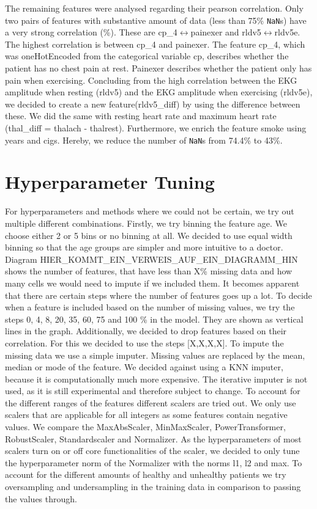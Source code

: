 The remaining features were analysed regarding their pearson correlation. Only two pairs of features with substantive amount of data (less than 75\% \texttt{NaN}s) have a very strong correlation (\%).  
These are cp\_4$\leftrightarrow$painexer and rldv5$\leftrightarrow$rldv5e. The highest correlation is between cp\_4 and painexer. The feature cp\_4, which was oneHotEncoded from the categorical variable cp, describes whether the patient has no chest pain at rest. Painexer describes whether the patient only has pain when exercising. 
Concluding from the high correlation between the EKG amplitude when resting (rldv5) and the EKG amplitude when exercising (rldv5e), we decided to create a new feature(rldv5_diff) by using the difference between these. We did the same with resting heart rate and maximum heart rate (thal_diff = thalach - thalrest). 
Furthermore, we enrich the feature smoke using years and cigs. Hereby, we reduce the number of \texttt{NaN}s from 74.4\% to 43\%. 

\section{Hyperparameter Tuning }
For hyperparameters and methods where we could not be certain, we try out multiple different combinations.
Firstly, we try binning the feature age. We choose either 2 or 5 bins or no binning at all. We decided to use equal width binning so that the age groups are simpler and more intuitive to a doctor.
Diagram HIER\_KOMMT\_EIN\_VERWEIS\_AUF\_EIN\_DIAGRAMM\_HIN shows the number of features, that have less than X\% missing data and how many cells we would need to impute if we included them. It becomes apparent that there are certain steps where the number of features goes up a lot. To decide when a feature is included based on the number of missing values, we try the steps 0, 4, 8, 20, 35, 60, 75 and 100 \% in the model. They are shown as vertical lines in the graph. Additionally, we decided to drop features based on their correlation. For this we decided to use the steps [X,X,X,X].
To impute the missing data we use a simple imputer. Missing values are replaced by the mean, median or mode of the feature. We decided against using a KNN imputer, because it is computationally much more expensive. The iterative imputer is not used, as it is still experimental and therefore subject to change.
To account for the different ranges of the features different scalers are tried out. We only use scalers that are applicable for all integers as some features contain negative values. 
We compare the MaxAbsScaler, MinMaxScaler, PowerTransformer, RobustScaler, Standardscaler and Normalizer. As the hyperparameters of most scalers turn on or off core functionalities of the scaler, we decided to only tune the hyperparameter norm of the Normalizer with the norms l1, l2 and max.
To account for the different amounts of healthy and unhealthy patients we try oversampling and undersampling in the training data in comparison to passing the values through.




